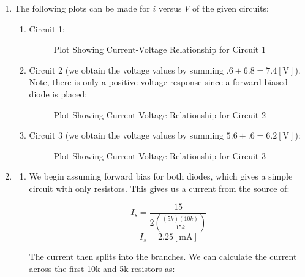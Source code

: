\begin{enumerate}

  \item The following plots can be made for $i$ versus $V$ of the given circuits:

    \begin{enumerate}

      \item Circuit 1:

        \begin{figure}[H]
          \centering
          
          \caption{Plot Showing Current-Voltage Relationship for Circuit 1}
          \label{fig:1}
        \end{figure}
        
      \item Circuit 2 (we obtain the voltage values by summing $.6+6.8=7.4[\si{\volt}]$). Note, there is only a positive voltage response since a forward-biased diode is placed:

        \begin{figure}[H]
          \centering
          
          \caption{Plot Showing Current-Voltage Relationship for Circuit 2}
          \label{fig:2}
        \end{figure}
        
      \item Circuit 3 (we obtain the voltage values by summing $5.6+.6=6.2[\si{\volt}]$):
        
        \begin{figure}[H]
          \centering
          
          \caption{Plot Showing Current-Voltage Relationship for Circuit 3}
          \label{fig:3}
        \end{figure}
        
    \end{enumerate}

  \item

    \begin{enumerate}

      \item We begin assuming forward bias for both diodes, which gives a simple circuit with only resistors. This gives us a current from the source of:

        $$I_s=\frac{15}{2\left( \frac{(5k)(10k)}{15k} \right)}$$
        $$I_s=2.25[\si{\milli\ampere}]$$

        The current then splits into the branches. We can calculate the current across the first 10k and 5k resistors as:


\end{enumerate}
\end{enumerate}

